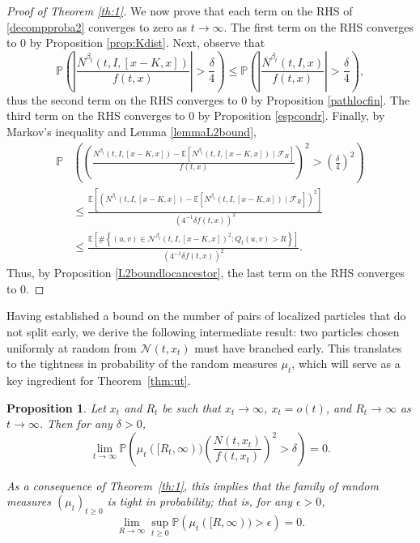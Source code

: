\documentclass{article}
\newtheorem{proposition}[theorem]{Proposition}
\newcommand{\NOB}[2]{\overline{N}^{#1}(#2)}
\newcommand{\E}[0]{\mathbb{E}}
\newcommand{\Prob}{\mathbb{P}}
\begin{document}
\begin{proof}[Proof of Theorem \ref{th:1}]
We now prove that each term on the RHS of \eqref{decompproba2} converges to zero as $t\to \infty$.
The first term on the RHS converges to 0 by Proposition \ref{prop:Kdist}. Next, observe that 
\begin{equation}
    \Prob\left(\left|\frac{\NOB{\beta_t}{t, I,[x-K,x]}  }{f(t,x)}\right|>\frac{\delta}{4}\right)\leq \Prob\left(\left|\frac{\NOB{\beta_t}{t, I,x} }{f(t,x)}\right|>\frac{\delta}{4}\right),
\end{equation}
thus the second term on the RHS converges to 0 by Proposition \ref{pathlocfin}.
The third term on the RHS converges to 0 by Proposition \ref{espcondr}.
Finally, by Markov's inequality and Lemma \ref{lemmaL2bound},
\begin{equation}
\begin{split}
    \Prob&\left(\left(\frac{N^{\beta_t}(t, I,[x-K,x]) - \E\left[N^{\beta_t}(t, I,[x-K,x])\mid \mathcal{F}_{R} \right]}{f(t,x)}\right)^2>\left(\frac{\delta}{4}\right)^2 \right)
    \\& \leq \frac{\mathbb{E}\left[\left(N^{\beta_t}(t, I,[x-K,x]) - \E\left[N^{\beta_t}(t, I,[x-K,x])\mid \mathcal{F}_{R} \right]\right)^2\right]}{(4^{-1}\delta f(t,x))^2}
    \\& \leq \frac{\E\left[\#\left\{(u,v) \in \mathcal{N}^{\beta_t}(t,I,[x-K,x])^2 : Q_t(u,v) >R \right\}\right]}{(4^{-1}\delta f(t,x))^2}.
\end{split}
\end{equation}
Thus, by Proposition \ref{L2boundlocancestor}, the last term on the RHS converges to 0.

\end{proof}

Having established a bound on the number of pairs of localized particles that do not split early, we derive the following intermediate result: two particles chosen uniformly at random from $\mathcal{N}(t,x_t)$ must have branched early. This translates to the tightness in probability of the random measures $\mu_t$, which will serve as a key ingredient for Theorem~\ref{thm:ut}.


\begin{proposition}\label{th:genealogy}
    Let \( x_t \) and \( R_t \) be such that \( x_t \to \infty \), \( x_t = o(t) \), and \( R_t \to \infty \) as \( t \to \infty \). Then for any \( \delta > 0 \),
    \begin{equation}
        \lim_{t \to \infty} \mathbb{P} \left( \mu_t([R_t, \infty)) \left( \frac{N(t, x_t)}{f(t,x_t)} \right)^2 > \delta \right) = 0.
    \end{equation}

    As a consequence of Theorem~\ref{th:1}, this implies that the family of random measures $(\mu_t)_{t \ge 0}$ is tight in probability; that is, for any $\epsilon > 0$,
    \begin{equation}
        \lim_{R \to \infty} \sup_{t\geq 0} \mathbb{P} \left( \mu_t([R, \infty)) > \epsilon \right) = 0.
    \end{equation}
\end{proposition}
\end{document}
